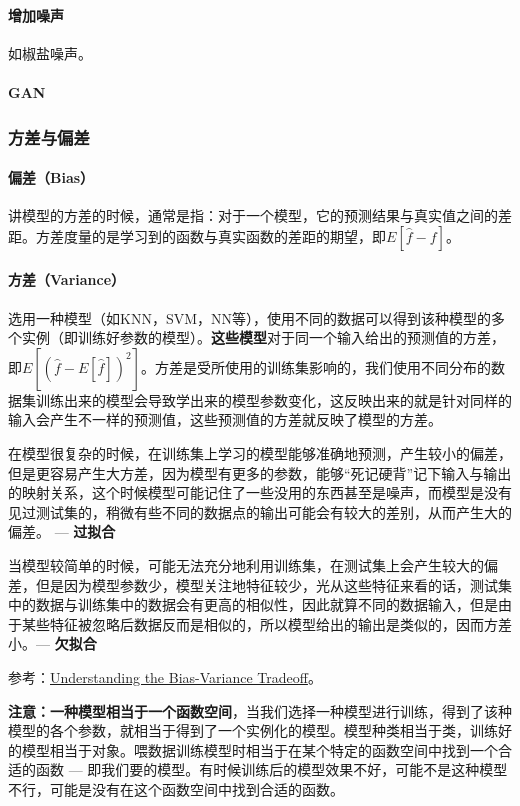 \paragraph{增加噪声}
如椒盐噪声。

\paragraph{GAN}


\subsubsection{方差与偏差}
\paragraph{偏差（Bias）}讲模型的方差的时候，通常是指：对于一个模型，它的预测结果与真实值之间的差距。方差度量的是学习到的函数与真实函数的差距的期望，即$E[\hat{f} - f]$。

\paragraph{方差（Variance）}选用一种模型（如KNN，SVM，NN等），使用不同的数据可以得到该种模型的多个实例（即训练好参数的模型）。\textbf{这些模型}对于同一个输入给出的预测值的方差，即$E[(\hat{f} - E[\hat{f}])^2]$。方差是受所使用的训练集影响的，我们使用不同分布的数据集训练出来的模型会导致学出来的模型参数变化，这反映出来的就是针对同样的输入会产生不一样的预测值，这些预测值的方差就反映了模型的方差。

在模型很复杂的时候，在训练集上学习的模型能够准确地预测，产生较小的偏差，但是更容易产生大方差，因为模型有更多的参数，能够“死记硬背”记下输入与输出的映射关系，这个时候模型可能记住了一些没用的东西甚至是噪声，而模型是没有见过测试集的，稍微有些不同的数据点的输出可能会有较大的差别，从而产生大的偏差。 --- \textbf{过拟合}

当模型较简单的时候，可能无法充分地利用训练集，在测试集上会产生较大的偏差，但是因为模型参数少，模型关注地特征较少，光从这些特征来看的话，测试集中的数据与训练集中的数据会有更高的相似性，因此就算不同的数据输入，但是由于某些特征被忽略后数据反而是相似的，所以模型给出的输出是类似的，因而方差小。--- \textbf{欠拟合}

参考：\href{http://scott.fortmann-roe.com/docs/BiasVariance.html}{Understanding the Bias-Variance Tradeoff}。


\textbf{注意：}\textbf{一种模型相当于一个函数空间}，当我们选择一种模型进行训练，得到了该种模型的各个参数，就相当于得到了一个实例化的模型。模型种类相当于类，训练好的模型相当于对象。喂数据训练模型时相当于在某个特定的函数空间中找到一个合适的函数 --- 即我们要的模型。有时候训练后的模型效果不好，可能不是这种模型不行，可能是没有在这个函数空间中找到合适的函数。

